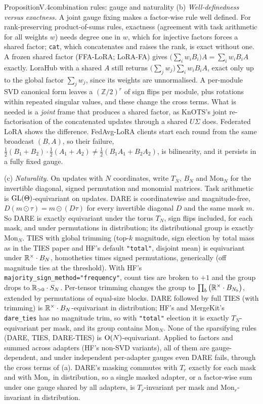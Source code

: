 \begin{restate}{Proposition}{V.4}{combination rules: gauge and naturality}
(b) \emph{Well-definedness versus exactness.} A joint gauge fixing makes a factor-wise rule well defined. For
rank-preserving product-of-sums rules, exactness (agreement with task arithmetic for all weights $w$) needs degree one in
$w$, which for injective factors forces a shared factor; \texttt{cat}, which concatenates and raises the rank, is exact
without one. A frozen shared factor (FFA-LoRA; LoRA-FA) gives $\big(\sum_iw_iB_i\big)A=\sum_iw_iB_iA$ exactly. LoraHub with
a shared $A$ still returns $\big(\sum_jw_j\big)\sum_iw_iB_iA$, exact only up to the global factor $\sum_jw_j$, since its
weights are unnormalised. A per-module SVD canonical form leaves a $(\mathbb Z/2)^r$ of sign flips per module, plus
rotations within repeated singular values, and these change the cross terms. What is needed is a \emph{joint} frame that
produces a shared factor, as KnOTS's joint re-factorisation of the concatenated updates through a shared $U\Sigma$ does.
Federated LoRA shows the difference. FedAvg-LoRA clients start each round from the same broadcast $(B,A)$, so their failure,
$\tfrac12(B_1+B_2)\cdot\tfrac12(A_1+A_2)\ne\tfrac12(B_1A_1+B_2A_2)$, is bilinearity, and it persists in a fully fixed gauge.

(c) \emph{Naturality.} On updates with $N$ coordinates, write $T_N$, $B_N$ and $\mathrm{Mon}_N$ for the invertible diagonal,
signed permutation and monomial matrices. Task arithmetic is $\mathrm{GL}(\Theta)$-equivariant on updates. DARE is coordinatewise
and magnitude-free, $D(m\odot\tau)=m\odot(D\tau)$ for every invertible diagonal $D$ and the same mask $m$. So DARE is exactly
equivariant under the torus $T_N$, sign flips included, for each mask, and under permutations in distribution; its
distributional group is exactly $\mathrm{Mon}_N$. TIES with global trimming (top-$k$ magnitude, sign election by total mass
as in the TIES paper and HF's default \texttt{"total"}, disjoint mean) is equivariant under $\mathbb{R}^\times\cdot B_N$,
homotheties times signed permutations, generically (off magnitude ties at the threshold). With HF's
\texttt{majority\_\allowbreak sign\_\allowbreak method="frequency"}, count ties are broken to $+1$ and the group drops to
$\mathbb{R}_{>0}\cdot S_N$. Per-tensor trimming changes the group to $\prod_b\big(\mathbb{R}^\times\cdot B_{N_b}\big)$, extended by
permutations of equal-size blocks. DARE followed by full TIES (with trimming) is $\mathbb{R}^\times\cdot B_N$-equivariant in
distribution; HF's and MergeKit's \texttt{dare\_ties} has no magnitude trim, so with \texttt{"total"} election it is exactly
$T_N$-equivariant per mask, and its group contains $\mathrm{Mon}_N$. None of the sparsifying rules (DARE, TIES, DARE-TIES)
is $\mathrm{O}(N)$-equivariant. Applied to factors and summed across adapters (HF's non-SVD variants), all of them are
gauge-dependent, and under independent per-adapter gauges even DARE fails, through the cross terms of (a). DARE's masking
commutes with $T_r$ exactly for each mask and with $\mathrm{Mon}_r$ in distribution, so a single masked adapter, or a
factor-wise sum under one gauge shared by all adapters, is $T_r$-invariant per mask and $\mathrm{Mon}_r$-invariant in
distribution.
\end{restate}

